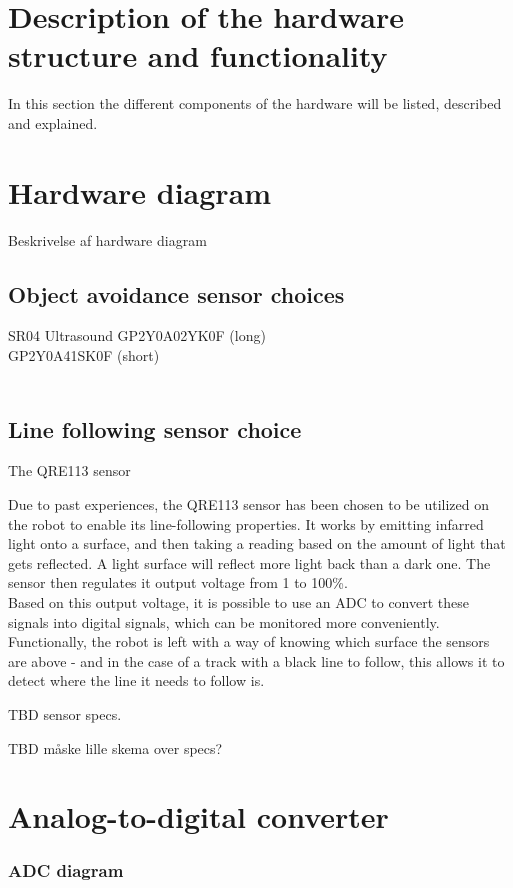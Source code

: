 \section{Description of the hardware structure and functionality}

In this section the different components of the hardware will be listed, described and explained.

\section{Hardware diagram}
Beskrivelse af hardware diagram


\subsection{Object avoidance sensor choices}
SR04 Ultrasound
GP2Y0A02YK0F (long) \\	
GP2Y0A41SK0F (short) \\
\\
\subsection{Line following sensor choice} 

The QRE113 sensor

Due to past experiences, the QRE113 sensor has been chosen to be utilized on the robot to enable its line-following properties. It works by emitting infarred light onto a surface, and then taking a reading based on the amount of light that gets reflected. A light surface will reflect more light back than a dark one. The sensor then regulates it output voltage from 1 to 100\%.\\ Based on this output voltage, it is possible to use an ADC to convert these signals into digital signals, which can be monitored more conveniently. Functionally, the robot is left with a way of knowing which surface the sensors are above - and in the case of a track with a black line to follow, this allows it to detect where the line it needs to follow is.\

TBD sensor specs.\

TBD måske lille skema over specs?

\section{Analog-to-digital converter}


\subsubsection{ADC diagram} 

